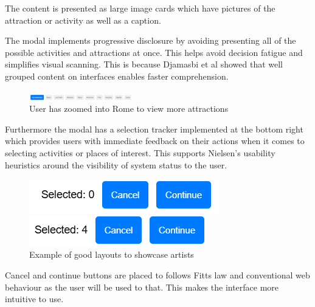\documentclass[]{project_final}
\begin{document}
The content is presented as large image cards which have pictures of the attraction or activity as well as a caption.

The modal implements progressive disclosure by avoiding presenting all of the possible activities and attractions at once. This helps avoid decision fatigue and simplifies visual scanning. This is because Djamasbi et al showed that well grouped content on interfaces enables faster comprehension.

\begin{figure}[ht!]
    \centering
    \includegraphics[width=0.4\textwidth]{tabs.png}
    \caption{User has zoomed into Rome to view more attractions}
    \label{fig:1}
\end{figure}

Furthermore the modal has a selection tracker implemented at the bottom right which provides users with immediate feedback on their actions when it comes to selecting activities or places of interest. This supports Nielsen's usability heuristics around the visibility of system status to the user.

\begin{figure}[ht!]
    \centering
    \begin{minipage}[t]{0.4\textwidth}
        \includegraphics[width=\textwidth]{0 selected.png}
    \end{minipage}
    \hfill
    \begin{minipage}[t]{0.4\textwidth}
        \includegraphics[width=\textwidth]{4 selected.png}
    \end{minipage}
    \caption{Example of good layouts to showcase artists}
    \label{fig:1}
\end{figure}

Cancel and continue buttons are placed to follows Fitts law and conventional web behaviour as the user will be used to that. This makes the interface more intuitive to use.
\end{document}

